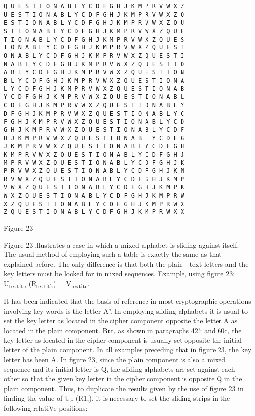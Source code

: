 \begin{textfigure}
        \begin{verbatim}
Q U E S T I O N A B L Y C D F G H J K M P R V W X Z
U E S T I O N A B L Y C D F G H J K M P R V W X Z Q
E S T I O N A B L Y C D F G H J K M P R V W X Z Q U
S T I O N A B L Y C D F G H J K M P R V W X Z Q U E
T I O N A B L Y C D F G H J K M P R V W X Z Q U E S
I O N A B L Y C D F G H J K M P R V W X Z Q U E S T
O N A B L Y C D F G H J K M P R V W X Z Q U E S T I
N A B L Y C D F G H J K M P R V W X Z Q U E S T I O
A B L Y C D F G H J K M P R V W X Z Q U E S T I O N
B L Y C D F G H J K M P R V W X Z Q U E S T I O N A
L Y C D F G H J K M P R V W X Z Q U E S T I O N A B
Y C D F G H J K M P R V W X Z Q U E S T I O N A B L
C D F G H J K M P R V W X Z Q U E S T I O N A B L Y
D F G H J K M P R V W X Z Q U E S T I O N A B L Y C
F G H J K M P R V W X Z Q U E S T I O N A B L Y C D
G H J K M P R V W X Z Q U E S T I O N A B L Y C D F
H J K M P R V W X Z Q U E S T I O N A B L Y C D F G
J K M P R V W X Z Q U E S T I O N A B L Y C D F G H
K M P R V W X Z Q U E S T I O N A B L Y C D F G H J
M P R V W X Z Q U E S T I O N A B L Y C D F G H J K
P R V W X Z Q U E S T I O N A B L Y C D F G H J K M
R V W X Z Q U E S T I O N A B L Y C D F G H J K M P
V W X Z Q U E S T I O N A B L Y C D F G H J K M P R
W X Z Q U E S T I O N A B L Y C D F G H J K M P R W
X Z Q U E S T I O N A B L Y C D F G H J K M P R W X
Z Q U E S T I O N A B L Y C D F G H J K M P R W X X
        \end{verbatim}
        \caption{Figure 23}
\end{textfigure}

\mypara Figure 23 illustrates a case in which a mixed alphabet is sliding
against itself. The usual method of employing such a table is exactly
the same as that explained before. The only difference is that both the
plain—text letters and the key letters must be looked for in mixed
sequences. Example, using ﬁgure 23: U\textsubscript{textit{p}} (R\textsubscript{textit{k}}) = V\textsubscript{textit{c}}.

\mypara It has been indicated that the basis of reference in most cryptographic operations involving key words is the letter A”. In employing
sliding alphabets it is usual to set the key letter as located in the cipher
component opposite the letter A as located in the plain component. But,
as shown in paragraphs 42!; and 60c, the key letter as located in the
cipher component is usually set opposite the initial letter of the plain
component. In all examples preceding that in ﬁgure 23, the key letter has
been A. In ﬁgure 23, since the plain component is also a mixed sequence
and its initial letter is Q, the sliding alphabets are set against each other
so that the given key letter in the cipher component is opposite Q in the
plain component. Thus, to duplicate the results given by the use of ﬁgure
23 in ﬁnding the value of Up (R1,), it is necessary to set the sliding strips
in the following relatiVe positions:

